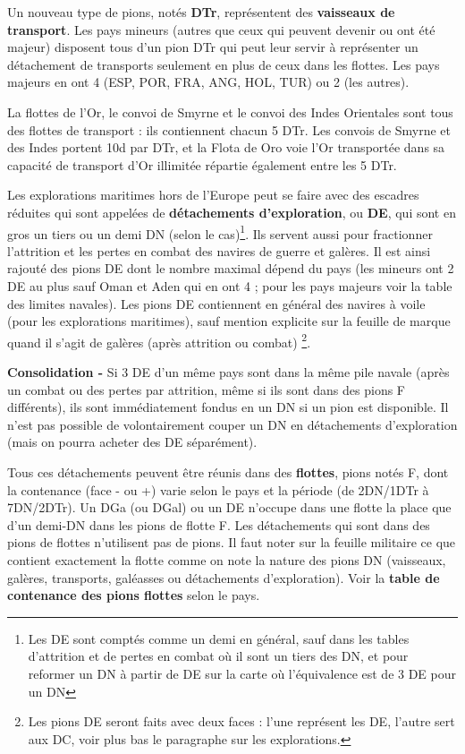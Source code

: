 Un nouveau type de pions, notés
{\bf DTr}, représentent des \textbf{vaisseaux de
transport}. Les pays mineurs (autres que ceux qui peuvent devenir ou ont été majeur)
disposent tous d'un pion DTr qui peut leur servir à représenter
un détachement de transports seulement en plus de ceux dans les flottes.
Les pays majeurs en ont 4 (ESP, POR, FRA, ANG, HOL, TUR)
ou 2 (les autres).

La flottes de l'Or, le convoi de Smyrne et le convoi des Indes Orientales
sont tous des flottes de transport : ils contiennent chacun
5 DTr. Les convois de Smyrne et des Indes portent 10d par DTr, et
la Flota de Oro voie l'Or transportée dans sa capacité de transport
d'Or illimitée répartie également entre les 5 DTr.
\medskip

Les explorations 
maritimes hors de l'Europe peut se faire avec des escadres réduites
qui sont appelées de \textbf{détachements d'exploration}, ou {\bf DE}, qui sont
en gros un tiers ou un demi DN (selon le cas)\footnote{
Les DE sont comptés comme un demi en général, sauf dans les tables
d'attrition et de pertes en combat où il sont un tiers des DN, et
pour reformer un DN à partir de DE sur la carte où l'équivalence est
de 3 DE pour un DN}. Ils servent aussi pour fractionner l'attrition
et les pertes en combat des navires de guerre et galères.  
Il est ainsi rajouté des pions DE dont le nombre maximal dépend du pays (les
mineurs ont 2 DE au plus sauf Oman et Aden qui en ont 4 ; 
pour les pays majeurs voir la table
des limites navales). Les pions DE contiennent en général des navires
à voile (pour les explorations maritimes), sauf mention explicite sur la feuille 
de marque quand il s'agit de galères (après attrition ou combat) \footnote{Les
pions DE seront faits avec deux faces : l'une représent les DE, l'autre
sert aux DC, voir plus bas le paragraphe sur les explorations.}. 

\textbf{Consolidation -} Si 3 DE d'un même pays sont dans la même pile navale (après 
un combat ou des pertes par attrition, même si ils sont dans des pions F différents), 
ils sont immédiatement fondus en un DN si
un pion est disponible. Il n'est pas possible de volontairement
couper un DN en détachements d'exploration (mais on pourra acheter
des DE séparément).
\medskip

Tous ces détachements peuvent être réunis dans des \textbf{flottes}, pions notés F, 
dont la contenance
(face - ou +) varie selon le pays et la période (de 2DN/1DTr à 7DN/2DTr).
Un DGa (ou DGal) ou un DE n'occupe dans une flotte la place que d'un demi-DN dans
les pions de flotte F.
Les détachements qui sont dans des pions de flottes
n'utilisent pas de pions. Il faut noter sur la feuille militaire ce que contient
exactement la flotte comme on note la nature des pions DN (vaisseaux,
galères, transports, galéasses ou détachements d'exploration). 
Voir la \textbf{table de contenance des pions flottes} selon le pays.
\medskip

